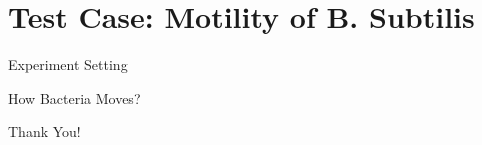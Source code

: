 \documentclass{beamer}
\begin{document}
	


\section{Test Case: Motility of B. Subtilis}
	\begin{frame}{Experiment Setting}

	\end{frame}
	\begin{frame}{How Bacteria Moves?}

	\end{frame}




\begin{frame}%
\begin{center}
{\fontsize{40}{50}\selectfont Thank You!}
\end{center}
\end{frame}
\end{document}

